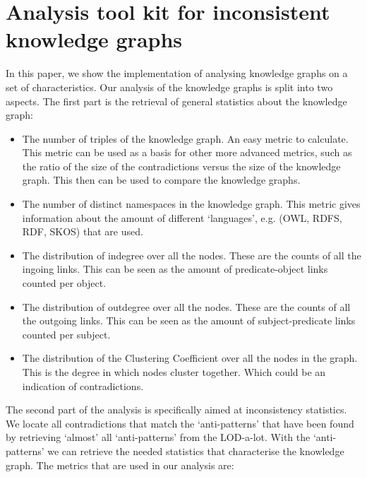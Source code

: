 \documentclass[11pt,letterpaper ,oneside ]{book}
\begin{document}
	\section{Analysis tool kit for inconsistent knowledge graphs}
	In this paper, we show the implementation of analysing knowledge graphs on a set of characteristics. Our analysis of the knowledge graphs is split into two aspects. The first part is the retrieval of general statistics about the knowledge graph:
	\begin{itemize}
		\item The number of triples of the knowledge graph. An easy metric to calculate. This metric can be used as a basis for other more advanced metrics, such as the ratio of the size of the contradictions versus the size of the knowledge graph. This then can be used to compare the knowledge graphs.
		\item The number of distinct namespaces in the knowledge graph. This metric gives information about the amount of different `languages', e.g. (OWL, RDFS, RDF, SKOS) that are used. 
		\item The distribution of indegree over all the nodes. These are the counts of all the ingoing links. This can be seen as the amount of predicate-object links counted per object.
		\item The distribution of outdegree over all the nodes. These are the counts of all the outgoing links. This can be seen as the amount of subject-predicate links counted per subject.
		\item The distribution of the Clustering Coefficient over all the nodes in the graph. This is the degree in which nodes cluster together. Which could be an indication of contradictions.  
	\end{itemize}
	The second part of the analysis is specifically aimed at inconsistency statistics. We locate all contradictions that match the `anti-patterns' that have been found by retrieving `almost' all `anti-patterns' from the LOD-a-lot. With the `anti-patterns' we can retrieve the needed statistics that characterise the knowledge graph. The metrics that are used in our analysis are:
	
\end{document}
